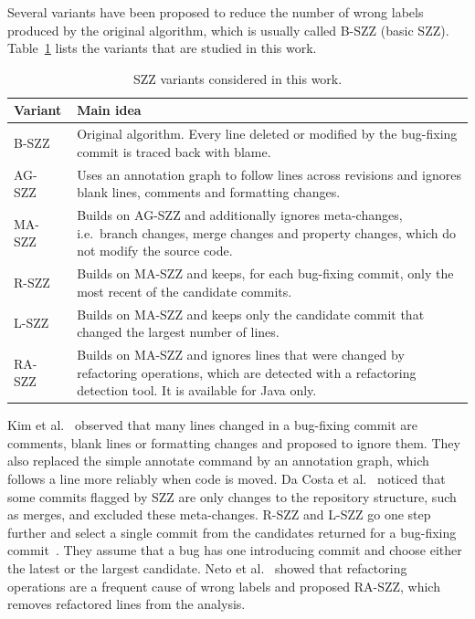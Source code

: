 \documentclass[12pt,a4paper,oneside]{report}
\begin{document}
Several variants have been proposed to reduce the number of wrong labels
produced by the original algorithm, which is usually called B-SZZ (basic
SZZ). Table~\ref{tab:variants} lists the variants that are studied in this
work.

\begin{table}[htbp]
\centering\small
\caption{SZZ variants considered in this work.}
\label{tab:variants}
\begin{tabularx}{\linewidth}{@{}l>{\raggedright\arraybackslash}X@{}}
\toprule
Variant & Main idea \\
\midrule
B-SZZ~\cite{sliwerski2005szz} & Original algorithm. Every line deleted or
modified by the bug-fixing commit is traced back with blame. \\
AG-SZZ~\cite{kim2006agszz} & Uses an annotation graph to follow lines across
revisions and ignores blank lines, comments and formatting changes. \\
MA-SZZ~\cite{dacosta2017maszz} & Builds on AG-SZZ and additionally ignores
meta-changes, i.e.\ branch changes, merge changes and property changes, which
do not modify the source code. \\
R-SZZ~\cite{davies2014rlszz} & Builds on MA-SZZ and keeps, for each bug-fixing
commit, only the most recent of the candidate commits. \\
L-SZZ~\cite{davies2014rlszz} & Builds on MA-SZZ and keeps only the candidate
commit that changed the largest number of lines. \\
RA-SZZ~\cite{neto2018raszz} & Builds on MA-SZZ and ignores lines that were
changed by refactoring operations, which are detected with a refactoring
detection tool. It is available for Java only. \\
\bottomrule
\end{tabularx}
\end{table}

Kim et al.~\cite{kim2006agszz} observed that many lines changed in a
bug-fixing commit are comments, blank lines or formatting changes and proposed
to ignore them. They also replaced the simple annotate command by an
annotation graph, which follows a line more reliably when code is moved. Da
Costa et al.~\cite{dacosta2017maszz} noticed that some commits flagged by SZZ
are only changes to the repository structure, such as merges, and excluded
these meta-changes. R-SZZ and L-SZZ go one step further and select a single
commit from the candidates returned for a bug-fixing
commit~\cite{davies2014rlszz}. They assume that a bug has one introducing
commit and choose either the latest or the largest candidate. Neto et
al.~\cite{neto2018raszz} showed that refactoring operations are a frequent
cause of wrong labels and proposed RA-SZZ, which removes refactored lines
from the analysis.
\end{document}
